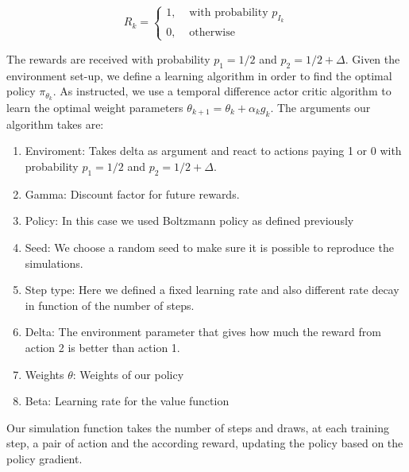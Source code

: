 \documentclass[a4paper, 11pt]{article} %
\begin{document}
$$
R_{k}=\left\{\begin{array}{ll}{1,} & {\text { with probability } p_{I_{k}}} \\ {0,} & {\text { otherwise }}\end{array}\right.
$$

The rewards are received with probability $p_{1}=1 / 2$ and $p_{2}=1 / 2+\Delta$. Given the environment set-up, we define a learning algorithm in order to find the optimal policy $\pi_{\theta_{k}}$. As instructed, we use a temporal difference actor critic algorithm to learn the optimal weight parameters $\theta_{k+1}=\theta_{k}+\alpha_{k} g_{k}$. The arguments our algorithm takes are:

\begin{enumerate}
	\item Enviroment: Takes delta as argument and react to actions paying 1 or 0 with probability $p_{1}=1 / 2$ and $p_{2}=1 / 2+\Delta$. 
	\item Gamma: Discount factor for future rewards. 
	\item Policy: In this case we used Boltzmann policy as defined previously
	\item Seed: We choose a random seed to make sure it is possible to reproduce the simulations.  
	\item Step type: Here we defined a fixed learning rate and also different rate decay in function of the number of steps.
	\item Delta: The environment parameter that gives how much the reward from action 2 is better than action 1.
	\item Weights $\theta$: Weights of our policy
	\item Beta: Learning rate for the value function
\end{enumerate}

Our simulation function takes the number of steps and draws, at each training step, a pair of action and the according reward, updating the policy based on the policy gradient.
\end{document}
